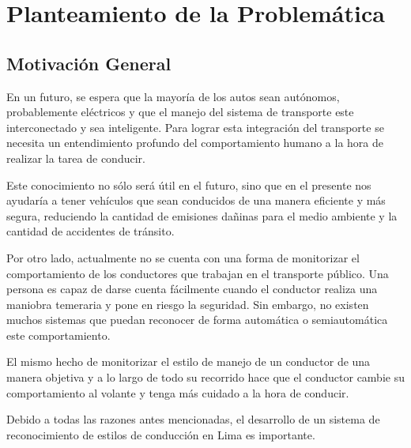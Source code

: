 
\chapter{Planteamiento de la Problemática}  %

\ifpdf
    \graphicspath{{Chapter1/Figs/Raster/}{Chapter1/Figs/PDF/}{Chapter1/Figs/}}
\else
    \graphicspath{{Chapter1/Figs/Vector/}{Chapter1/Figs/}}
\fi


\section{Motivación General}

En un futuro, se espera que la mayoría de los autos sean autónomos, probablemente eléctricos y que el manejo del sistema de transporte este interconectado y sea inteligente. Para lograr esta integración del transporte se necesita un entendimiento profundo del comportamiento humano a la hora de realizar la tarea de conducir.

Este conocimiento no sólo será útil en el futuro, sino que en el presente nos ayudaría a tener vehículos que sean conducidos de una manera eficiente y más segura, reduciendo  la cantidad de emisiones dañinas para el medio ambiente y la cantidad de accidentes de tránsito.

Por otro lado, actualmente no se cuenta con una forma de monitorizar el comportamiento de los conductores que trabajan en el transporte público. Una persona es capaz de darse cuenta fácilmente cuando el conductor realiza una maniobra temeraria y pone en riesgo la seguridad. Sin embargo, no existen muchos sistemas que puedan reconocer de forma automática o semiautomática este comportamiento.

El  mismo hecho de monitorizar el estilo de manejo de un conductor de una manera objetiva y a lo largo de todo su recorrido hace que el conductor cambie su comportamiento al volante y tenga más cuidado a la hora de conducir.

Debido a todas las razones antes mencionadas, el desarrollo de un sistema de reconocimiento de estilos de conducción en Lima es importante.

